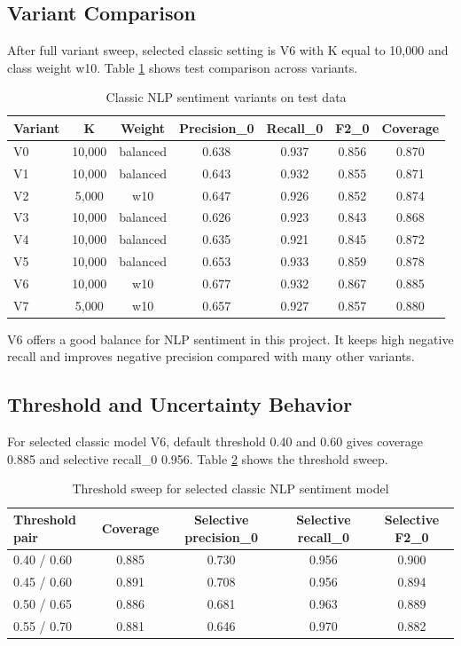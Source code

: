\documentclass[12pt,a4paper]{article}
\begin{document}
\subsection{Variant Comparison}
After full variant sweep, selected classic setting is V6 with K equal to 10,000 and class weight w10. Table \ref{tab:nlp_variant_test} shows test comparison across variants.

\begin{table}[H]
\centering
\caption{Classic NLP sentiment variants on test data}
\label{tab:nlp_variant_test}
\begin{tabular}{lcccccc}
\toprule
Variant & K & Weight & Precision\_0 & Recall\_0 & F2\_0 & Coverage \\
\midrule
V0 & 10,000 & balanced & 0.638 & 0.937 & 0.856 & 0.870 \\
V1 & 10,000 & balanced & 0.643 & 0.932 & 0.855 & 0.871 \\
V2 & 5,000 & w10 & 0.647 & 0.926 & 0.852 & 0.874 \\
V3 & 10,000 & balanced & 0.626 & 0.923 & 0.843 & 0.868 \\
V4 & 10,000 & balanced & 0.635 & 0.921 & 0.845 & 0.872 \\
V5 & 10,000 & balanced & 0.653 & 0.933 & 0.859 & 0.878 \\
V6 & 10,000 & w10 & 0.677 & 0.932 & 0.867 & 0.885 \\
V7 & 5,000 & w10 & 0.657 & 0.927 & 0.857 & 0.880 \\
\bottomrule
\end{tabular}
\end{table}

V6 offers a good balance for NLP sentiment in this project. It keeps high negative recall and improves negative precision compared with many other variants.

\subsection{Threshold and Uncertainty Behavior}
For selected classic model V6, default threshold 0.40 and 0.60 gives coverage 0.885 and selective recall\_0 0.956. Table \ref{tab:nlp_classic_threshold} shows the threshold sweep.

\begin{table}[H]
\centering
\caption{Threshold sweep for selected classic NLP sentiment model}
\label{tab:nlp_classic_threshold}
\begin{tabular}{lcccc}
\toprule
Threshold pair & Coverage & Selective precision\_0 & Selective recall\_0 & Selective F2\_0 \\
\midrule
0.40 / 0.60 & 0.885 & 0.730 & 0.956 & 0.900 \\
0.45 / 0.60 & 0.891 & 0.708 & 0.956 & 0.894 \\
0.50 / 0.65 & 0.886 & 0.681 & 0.963 & 0.889 \\
0.55 / 0.70 & 0.881 & 0.646 & 0.970 & 0.882 \\
\bottomrule
\end{tabular}
\end{table}
\end{document}
